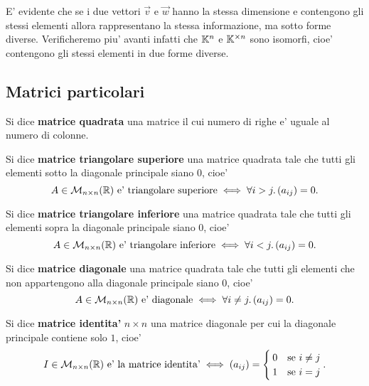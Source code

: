 E' evidente che se i due vettori $\vec{v}$ e $\vec{w}$ hanno la stessa dimensione e contengono gli stessi elementi allora rappresentano la stessa informazione, ma sotto forme diverse. Verificheremo piu' avanti infatti che $\mathbb{K}^n$ e $\mathbb{K}^{\times n}$ sono isomorfi, cioe' contengono gli stessi elementi in due forme diverse.

\subsection{Matrici particolari}

\begin{definition}
    Si dice \textbf{matrice quadrata} una matrice il cui numero di righe e' uguale al numero di colonne.
\end{definition}

\begin{definition}
    Si dice \textbf{matrice triangolare superiore} una matrice quadrata tale che tutti gli elementi sotto la diagonale principale siano $0$, cioe'
    \begin{equation}
        A \in \mathcal{M}_{n \times n}(\mathbb{R}) \text{ e' triangolare superiore}  \iff \forall i > j. \, (a_{ij}) = 0.
    \end{equation}
\end{definition}

\begin{definition}
    Si dice \textbf{matrice triangolare inferiore} una matrice quadrata tale che tutti gli elementi sopra la diagonale principale siano $0$, cioe'
    \begin{equation}
        A \in \mathcal{M}_{n \times n}(\mathbb{R}) \text{ e' triangolare inferiore} \iff \forall i < j. \, (a_{ij}) = 0.
    \end{equation}
\end{definition}

\begin{definition}
    Si dice \textbf{matrice diagonale} una matrice quadrata tale che tutti gli elementi che non appartengono alla diagonale principale siano $0$, cioe'
    \begin{equation}
        A \in \mathcal{M}_{n \times n}(\mathbb{R}) \text{ e' diagonale} \iff \forall i \neq j. \, (a_{ij}) = 0.
    \end{equation}
\end{definition}

\begin{definition}
    Si dice \textbf{matrice identita'} $n \times n$ una matrice diagonale per cui la diagonale principale contiene solo $1$, cioe'
    \begin{equation}
        I \in \mathcal{M}_{n \times n}(\mathbb{R}) \text{ e' la matrice identita'} \iff (a_{ij}) = \begin{cases}
            0   &\text{se } i \neq j \\
            1   &\text{se } i = j \\
        \end{cases}.
    \end{equation}
\end{definition}

